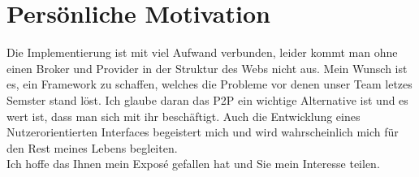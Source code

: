 \documentclass[10pt]{article}
\begin{document}
    \section{Persönliche Motivation}\label{sec:Motivation}
    Die Implementierung ist mit viel Aufwand verbunden, leider kommt man ohne einen Broker und Provider in der Struktur des Webs nicht aus. Mein Wunsch ist es, ein Framework zu schaffen, welches die Probleme vor denen unser Team letzes Semster stand löst. Ich glaube daran das P2P ein wichtige Alternative ist und es wert ist, dass man sich mit ihr beschäftigt. Auch die Entwicklung eines Nutzerorientierten Interfaces begeistert mich und wird wahrscheinlich mich für den Rest meines Lebens begleiten. \\
    Ich hoffe das Ihnen mein Exposé gefallen hat und Sie mein Interesse teilen.     

     
    
\end{document}
